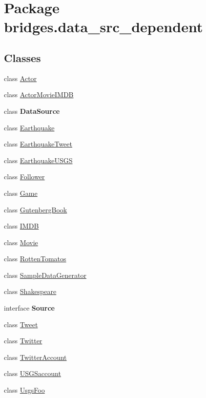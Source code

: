 \hypertarget{namespacebridges_1_1data__src__dependent}{}\section{Package bridges.\+data\+\_\+src\+\_\+dependent}
\label{namespacebridges_1_1data__src__dependent}
\subsection*{Classes}
\begin{DoxyCompactItemize}
\item 
class \hyperlink{classbridges_1_1data__src__dependent_1_1_actor}{Actor}
\item 
class \hyperlink{classbridges_1_1data__src__dependent_1_1_actor_movie_i_m_d_b}{Actor\+Movie\+I\+M\+DB}
\item 
class {\bfseries Data\+Source}
\item 
class \hyperlink{classbridges_1_1data__src__dependent_1_1_earthquake}{Earthquake}
\item 
class \hyperlink{classbridges_1_1data__src__dependent_1_1_earthquake_tweet}{Earthquake\+Tweet}
\item 
class \hyperlink{classbridges_1_1data__src__dependent_1_1_earthquake_u_s_g_s}{Earthquake\+U\+S\+GS}
\item 
class \hyperlink{classbridges_1_1data__src__dependent_1_1_follower}{Follower}
\item 
class \hyperlink{classbridges_1_1data__src__dependent_1_1_game}{Game}
\item 
class \hyperlink{classbridges_1_1data__src__dependent_1_1_gutenberg_book}{Gutenberg\+Book}
\item 
class \hyperlink{classbridges_1_1data__src__dependent_1_1_i_m_d_b}{I\+M\+DB}
\item 
class \hyperlink{classbridges_1_1data__src__dependent_1_1_movie}{Movie}
\item 
class \hyperlink{classbridges_1_1data__src__dependent_1_1_rotten_tomatos}{Rotten\+Tomatos}
\item 
class \hyperlink{classbridges_1_1data__src__dependent_1_1_sample_data_generator}{Sample\+Data\+Generator}
\item 
class \hyperlink{classbridges_1_1data__src__dependent_1_1_shakespeare}{Shakespeare}
\item 
interface {\bfseries Source}
\item 
class \hyperlink{classbridges_1_1data__src__dependent_1_1_tweet}{Tweet}
\item 
class \hyperlink{classbridges_1_1data__src__dependent_1_1_twitter}{Twitter}
\item 
class \hyperlink{classbridges_1_1data__src__dependent_1_1_twitter_account}{Twitter\+Account}
\item 
class \hyperlink{classbridges_1_1data__src__dependent_1_1_u_s_g_saccount}{U\+S\+G\+Saccount}
\item 
class \hyperlink{classbridges_1_1data__src__dependent_1_1_usgs_foo}{Usgs\+Foo}
\end{DoxyCompactItemize}
